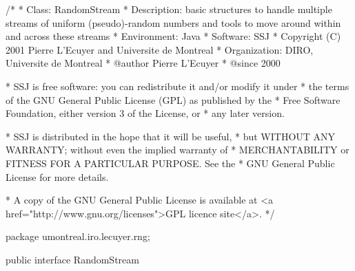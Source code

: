 \begin{code}
\begin{hide}
/*
 * Class:        RandomStream
 * Description:  basic structures to handle multiple streams of uniform
                 (pseudo)-random numbers and tools to move around within
                 and across these streams
 * Environment:  Java
 * Software:     SSJ 
 * Copyright (C) 2001  Pierre L'Ecuyer and Universite de Montreal
 * Organization: DIRO, Universite de Montreal
 * @author       Pierre L'Ecuyer
 * @since        2000

 * SSJ is free software: you can redistribute it and/or modify it under
 * the terms of the GNU General Public License (GPL) as published by the
 * Free Software Foundation, either version 3 of the License, or
 * any later version.

 * SSJ is distributed in the hope that it will be useful,
 * but WITHOUT ANY WARRANTY; without even the implied warranty of
 * MERCHANTABILITY or FITNESS FOR A PARTICULAR PURPOSE.  See the
 * GNU General Public License for more details.

 * A copy of the GNU General Public License is available at
   <a href="http://www.gnu.org/licenses">GPL licence site</a>.
 */
\end{hide}
package umontreal.iro.lecuyer.rng;

public interface RandomStream \begin{hide} { \end{hide}
\end{code}


